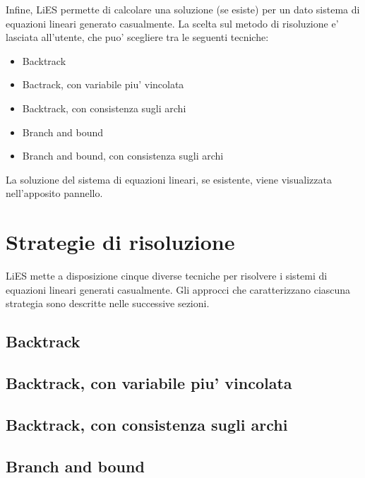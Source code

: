 \documentclass{article}
\begin{document}
Infine, LiES permette di calcolare una soluzione (se esiste) per un dato sistema di equazioni lineari generato casualmente. La scelta sul metodo di risoluzione e' lasciata all'utente, che puo' scegliere tra le seguenti tecniche:
\begin{itemize}
	\item Backtrack
	\item Bactrack, con variabile piu' vincolata
	\item Backtrack, con consistenza sugli archi
	\item Branch and bound
	\item Branch and bound, con consistenza sugli archi
\end{itemize}

La soluzione del sistema di equazioni lineari, se esistente, viene visualizzata nell'apposito pannello.\\


\section{Strategie di risoluzione}
\label{sec:strategie}

LiES mette a disposizione cinque diverse tecniche per risolvere i sistemi di equazioni lineari generati casualmente. Gli approcci che caratterizzano ciascuna strategia sono descritte nelle successive sezioni.

\subsection{Backtrack}
\label{sec:backtrack}

\subsection{Backtrack, con variabile piu' vincolata}
\label{sec:backtrack_mc}

\subsection{Backtrack, con consistenza sugli archi}
\label{sec:backtrack_ac}

\subsection{Branch and bound}
\label{sec:branch_and_bound}
\end{document}
